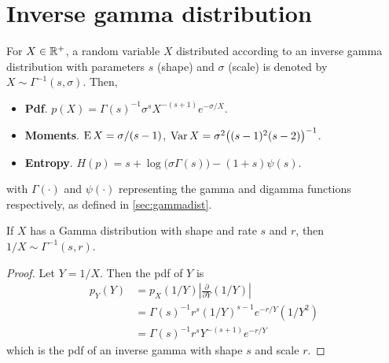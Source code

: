\section{Inverse gamma distribution}
\label{def:invgam}

For $X\in\mathbb{R}^+$, a random variable $X$ distributed according to an inverse gamma distribution with parameters $s$ (shape) and $\sigma$ (scale) is denoted by $X\sim\Gamma^{-1}(s,\sigma)$.
Then,
\begin{itemize}
  \item \textbf{Pdf}. $p(X) = \Gamma(s)^{-1} \sigma^s  X^{-(s+1)} e^{-\sigma/X}$.
  \item \textbf{Moments}. $\operatorname{E} X=\sigma/(s-1)$, $\operatorname{Var} X = \sigma^2\big((s-1)^2(s-2) \big)^{-1}$.
  \item \textbf{Entropy}. $H(p)= s + \log \big(\sigma\Gamma(s)\big) - (1+s)\psi(s)$.
\end{itemize}
with $\Gamma(\cdot)$ and $\psi(\cdot)$ representing the gamma and digamma functions respectively, as defined in \cref{sec:gammadist}.

\begin{lemma}
  If $X$ has a Gamma distribution with shape and rate $s$ and $r$, then $1/X \sim \Gamma^{-1}(s,r)$.
\end{lemma}

\begin{proof}
  Let $Y=1/X$.
  Then the pdf of $Y$ is
  \begin{align*}
    p_Y(Y) 
    &= p_X(1/Y) \left\vert \frac{\partial}{\partial Y} (1/Y) \right\vert \\
    &= \Gamma(s)^{-1} r^s (1/Y)^{s-1} e^{-r/Y} (1/Y^2) \\
    &= \Gamma(s)^{-1} r^s Y^{-(s+1)} e^{-r/Y}
  \end{align*}
  which is the pdf of an inverse gamma with shape $s$ and scale $r$.
\end{proof}



